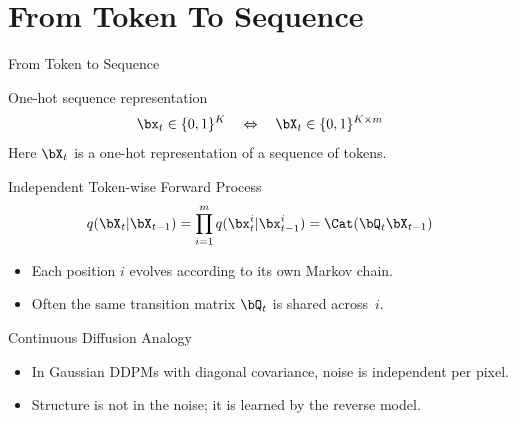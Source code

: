 \documentclass{beamer}
\begin{document}
\section{From Token To Sequence}
\begin{frame}{From Token to Sequence}
    \begin{block}{One-hot sequence representation}
        \vspace{-0.3cm}
        \[
            \bx_t \in \{0,1\}^K
            \quad\Leftrightarrow\quad
            \bX_t \in \{0,1\}^{K \times m}
        \]
        \vspace{-0.2cm}
        Here $\bX_t$ is a one-hot representation of a sequence of tokens.
    \end{block}
    \eqpause
    \begin{block}{Independent Token-wise Forward Process}
        \vspace{-0.3cm}
        \[
            q(\bX_t |\bX_{t-1}) =
            \prod_{i=1}^m q(\bx_t^i |\bx_{t-1}^i) = \Cat(\bQ_t \bX_{t-1})
        \]
        \vspace{-0.3cm}
        \begin{itemize}
            \item Each position $i$ evolves according to its own Markov chain.
            \item Often the same transition matrix $\bQ_t$ is shared across~$i$.
        \end{itemize}
    \end{block}
    \eqpause
    \begin{block}{Continuous Diffusion Analogy}
        \begin{itemize}
            \item In Gaussian DDPMs with diagonal covariance, noise is independent per pixel.
            \item Structure is not in the noise; it is learned by the reverse model.
        \end{itemize}
    \end{block}
\end{frame}
\end{document}
